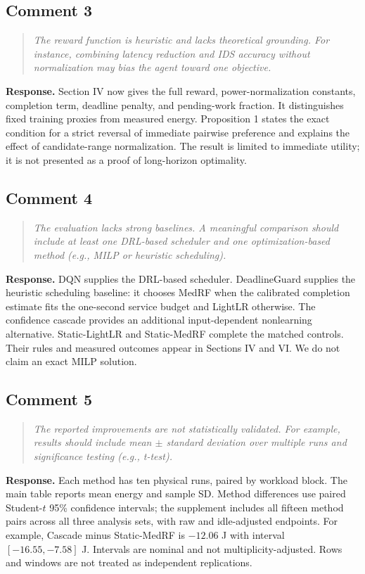 \documentclass[11pt,a4paper]{article}
\newenvironment{comment}{\begin{quote}\small\itshape}{\end{quote}}
\newcommand{\response}{\noindent\textbf{Response.} }
\begin{document}
\subsection*{Comment 3}
\begin{comment}
The reward function is heuristic and lacks theoretical grounding. For instance, combining latency reduction and IDS accuracy without normalization may bias the agent toward one objective.
\end{comment}
\response Section IV now gives the full reward, power-normalization constants, completion term, deadline penalty, and pending-work fraction. It distinguishes fixed training proxies from measured energy. Proposition 1 states the exact condition for a strict reversal of immediate pairwise preference and explains the effect of candidate-range normalization. The result is limited to immediate utility; it is not presented as a proof of long-horizon optimality.

\subsection*{Comment 4}
\begin{comment}
The evaluation lacks strong baselines. A meaningful comparison should include at least one DRL-based scheduler and one optimization-based method (e.g., MILP or heuristic scheduling).
\end{comment}
\response DQN supplies the DRL-based scheduler. DeadlineGuard supplies the heuristic scheduling baseline: it chooses MedRF when the calibrated completion estimate fits the one-second service budget and LightLR otherwise. The confidence cascade provides an additional input-dependent nonlearning alternative. Static-LightLR and Static-MedRF complete the matched controls. Their rules and measured outcomes appear in Sections IV and VI. We do not claim an exact MILP solution.

\subsection*{Comment 5}
\begin{comment}
The reported improvements are not statistically validated. For example, results should include mean $\pm$ standard deviation over multiple runs and significance testing (e.g., t-test).
\end{comment}
\response Each method has ten physical runs, paired by workload block. The main table reports mean energy and sample SD. Method differences use paired Student-$t$ 95\% confidence intervals; the supplement includes all fifteen method pairs across all three analysis sets, with raw and idle-adjusted endpoints. For example, Cascade minus Static-MedRF is $-12.06$ J with interval $[-16.55,-7.58]$ J. Intervals are nominal and not multiplicity-adjusted. Rows and windows are not treated as independent replications.
\end{document}
